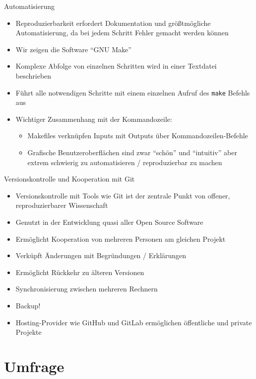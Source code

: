\begin{frame}{Automatisierung}
  \begin{itemize}
    \item Reproduzierbarkeit erfordert Dokumentation und größtmögliche Automatisierung, da bei jedem Schritt Fehler gemacht werden können
    \item Wir zeigen die Software \enquote{GNU Make}
    \item Komplexe Abfolge von einzelnen Schritten wird in einer Textdatei beschrieben
    \item Führt alle notwendigen Schritte mit einem einzelnen Aufruf des \texttt{make} Befehls aus
    \item Wichtiger Zusammenhang mit der Kommandozeile:
      \begin{itemize}
        \item Makefiles verknüpfen Inputs mit Outputs über Kommandozeilen-Befehle
        \item Grafische Benutzeroberflächen sind zwar \enquote{schön} und \enquote{intuitiv} aber extrem schwierig zu automatisieren / reproduzierbar zu machen
      \end{itemize}
  \end{itemize}
\end{frame}


\begin{frame}{Versionskontrolle und Kooperation mit Git}
  \begin{itemize}
    \item Versionskontrolle mit Tools wie Git ist der zentrale Punkt von offener, reproduzierbarer Wissenschaft
    \item Genutzt in der Entwicklung quasi aller Open Source Software
    \item Ermöglicht Kooperation von mehreren Personen am gleichen Projekt
    \item Verküpft Änderungen mit Begründungen / Erklärungen
    \item Ermöglicht Rückkehr zu älteren Versionen
    \item Synchronisierung zwischen mehreren Rechnern
    \item Backup!
    \item Hosting-Provider wie GitHub und GitLab ermöglichen öffentliche und private Projekte
  \end{itemize}
\end{frame}


\section{Umfrage}

